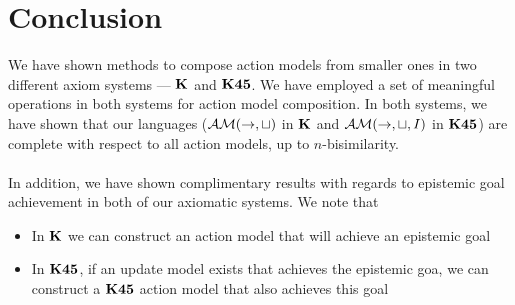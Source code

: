 \chapter{Conclusion}

We have shown methods to compose action models from smaller ones in two different axiom systems --- $\bf K$
and $\bf K45$.
We have employed a set of meaningful operations in both systems for action model composition.
In both systems, we have shown that our languages ($\mathcal{AM}(\to,\sqcup)$ in $\bf K$ and
$\mathcal{AM}(\to,\sqcup,I)$ in $\bf K45$) are complete with respect to all action models, up to
$n$-bisimilarity.\\
\\
In addition, we have shown complimentary results with regards to epistemic goal achievement in both
of our axiomatic systems.
We note that
\begin{itemize}
	\item In $\bf K$ we can construct an action model that will achieve an epistemic goal
	\item In $\bf K45$, if an update model exists that achieves the epistemic goa, we can construct a
		$\bf K45$ action model that also achieves this goal
\end{itemize}

